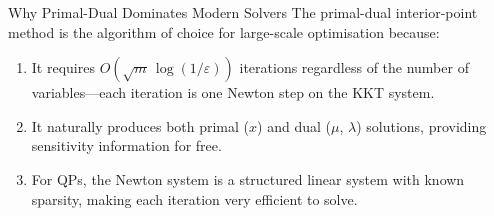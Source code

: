 \begin{notebox}{Why Primal-Dual Dominates Modern Solvers}
	The primal-dual interior-point method is the algorithm of choice for large-scale optimisation because:
	\begin{enumerate}
		\item It requires $O(\sqrt{m}\, \log(1/\varepsilon))$ iterations regardless of the number of variables---each iteration is one Newton step on the KKT system.
		\item It naturally produces both primal ($x$) and dual ($\mu$, $\lambda$) solutions, providing sensitivity information for free.
		\item For QPs, the Newton system is a structured linear system with known sparsity, making each iteration very efficient to solve.
	\end{enumerate}
\end{notebox}

